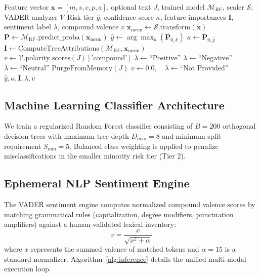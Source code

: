 \documentclass[conference]{IEEEtran}
\begin{document}
\begin{algorithm}[t]
\caption{Dual-Modality Lifestyle Risk and Ephemeral Sentiment Inference}
\label{alg:inference}
\begin{algorithmic}[1]
\REQUIRE Feature vector $\mathbf{x} = [m, s, c, p, a]$, optional text $J$, trained model $\mathcal{M}_{\text{RF}}$, scaler $\mathcal{S}$, VADER analyzer $\mathcal{V}$
\ENSURE Risk tier $\hat{y}$, confidence score $\kappa$, feature importances $\mathbf{I}$, sentiment label $\lambda$, compound valence $v$
\STATE $\mathbf{x}_{\text{norm}} \leftarrow \mathcal{S}.\text{transform}(\mathbf{x})$
\STATE $\mathbf{P} \leftarrow \mathcal{M}_{\text{RF}}.\text{predict\_proba}(\mathbf{x}_{\text{norm}})$ 
\STATE $\hat{y} \leftarrow \arg\max_k (\mathbf{P}_{0, k})$
\STATE $\kappa \leftarrow \mathbf{P}_{0, \hat{y}}$
\STATE $\mathbf{I} \leftarrow \text{ComputeTreeAttributions}(\mathcal{M}_{\text{RF}}, \mathbf{x}_{\text{norm}})$
    \STATE $v \leftarrow \mathcal{V}.\text{polarity\_scores}(J)[\text{'compound'}]$
        \STATE $\lambda \leftarrow \text{``Positive''}$
        \STATE $\lambda \leftarrow \text{``Negative''}$
    \ELSE
        \STATE $\lambda \leftarrow \text{``Neutral''}$
    \ENDIF
    \STATE $\text{PurgeFromMemory}(J)$ 
\ELSE
    \STATE $v \leftarrow 0.0, \quad \lambda \leftarrow \text{``Not Provided''}$
\ENDIF
\RETURN $\hat{y}, \kappa, \mathbf{I}, \lambda, v$
\end{algorithmic}
\end{algorithm}

\subsection{Machine Learning Classifier Architecture}
We train a regularized Random Forest classifier consisting of $B = 200$ orthogonal decision trees with maximum tree depth $D_{\max} = 8$ and minimum split requirement $S_{\min} = 5$. Balanced class weighting is applied to penalize misclassifications in the smaller minority risk tier (Tier 2).

\subsection{Ephemeral NLP Sentiment Engine}
The VADER sentiment engine computes normalized compound valence scores by matching grammatical rules (capitalization, degree modifiers, punctuation amplifiers) against a human-validated lexical inventory:
\begin{equation}
v = \frac{x}{\sqrt{x^2 + \alpha}}
\end{equation}
where $x$ represents the summed valence of matched tokens and $\alpha = 15$ is a standard normalizer. Algorithm~\ref{alg:inference} details the unified multi-modal execution loop.
\end{document}
